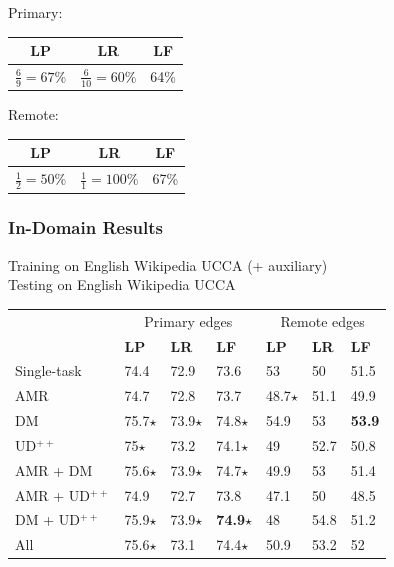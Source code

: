 \documentclass[t,xcolor={svgnames}]{beamer}
\begin{document}
\begin{frame}
\begin{adjustbox}{frame,scale=.75,center}
\end{adjustbox}
\vfill
\begin{adjustbox}{scale=.75,center}
	Primary:
	\begin{tabular}{ccc}
		\textbf{LP} & \textbf{LR} & \textbf{LF} \\ \hline
		$\frac69=67\%$ & $\frac6{10}=60\%$ & 64\%
	\end{tabular}
	\hspace{1cm}
	Remote:
	\begin{tabular}{ccc}
		\textbf{LP} & \textbf{LR} & \textbf{LF} \\ \hline
		$\frac12=50\%$ & $\frac11=100\%$ & 67\%
	\end{tabular}
\end{adjustbox}
\end{frame}

\begin{frame}
\frametitle{In-Domain Results}
Training on English Wikipedia UCCA (+ auxiliary) \\ Testing on English Wikipedia UCCA
\begin{center}
	\begin{tabular}{l|lll|lll}
	& \multicolumn{3}{c|}{Primary edges} & \multicolumn{3}{c}{Remote edges} \\
	& \textbf{LP} & \textbf{LR} & \textbf{LF}
	& \textbf{LP} & \textbf{LR} & \textbf{LF} \\
	\hline
	Single-task
	& 74.4 & 72.9 & 73.6 & 53 & 50 & 51.5 \\
	\cline{1-1}
	AMR
	& 74.7 & 72.8 & 73.7 & 48.7$\star$ & 51.1 & 49.9 \\
	DM
	& 75.7$\star$ & 73.9$\star$ & 74.8$\star$ & 54.9 & 53 & \textbf{53.9} \\
	UD$^{++}$
	& 75$\star$ & 73.2 & 74.1$\star$ & 49 & 52.7 & 50.8 \\
	AMR + DM
	& 75.6$\star$ & 73.9$\star$ & 74.7$\star$ & 49.9 & 53 & 51.4 \\
	AMR + UD$^{++}$
	& 74.9 & 72.7 & 73.8 & 47.1 & 50 & 48.5 \\
	DM + UD$^{++}$
	& 75.9$\star$ & 73.9$\star$ & \textbf{74.9}$\star$ & 48 & 54.8 & 51.2 \\
	All
	& 75.6$\star$ & 73.1 & 74.4$\star$ & 50.9 & 53.2 & 52
	\end{tabular}
\end{center}
\end{frame}
\end{document}
